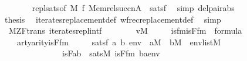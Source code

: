 \begin{isabellebody}
\ \ \ \ \ \ \isamarkupfalse%
\ repl{\isacharunderscore}{\kern0pt}sats{\isacharbrackleft}{\kern0pt}of\ M\ {\isacharquery}{\kern0pt}f\ {\isachardoublequoteopen}{\isacharbrackleft}{\kern0pt}Memrel{\isacharparenleft}{\kern0pt}succ{\isacharparenleft}{\kern0pt}n{\isacharparenright}{\kern0pt}{\isacharparenright}{\kern0pt}{\isacharcomma}{\kern0pt}A{\isacharcomma}{\kern0pt}{}{\isacharbrackright}{\kern0pt}{\isachardoublequoteclose}{\isacharbrackright}{\kern0pt}\ \ satsf\ \isamarkupfalse%
\ {\isacharparenleft}{\kern0pt}simp\ del{\isacharcolon}{\kern0pt}pair{\isacharunderscore}{\kern0pt}abs{\isacharparenright}{\kern0pt}\isanewline
\ \ \isacommand{{\isacharbraceright}{\kern0pt}}\isamarkupfalse%
\isanewline
\ \ \isamarkupfalse%
\isanewline
\ \ \isamarkupfalse%
\ {\isacharquery}{\kern0pt}thesis\ \isamarkupfalse%
\ iterates{\isacharunderscore}{\kern0pt}replacement{\isacharunderscore}{\kern0pt}def\ wfrec{\isacharunderscore}{\kern0pt}replacement{\isacharunderscore}{\kern0pt}def\ \isamarkupfalse%
\ simp\isanewline
{}\isamarkupfalse%
%
\endisatagproof
{\isafoldproof}%
%
\isadelimproof
\isanewline
%
\endisadelimproof
\isanewline
\isanewline
\isanewline
\isanewline
{}\isamarkupfalse%
\ {\isacharparenleft}{\kern0pt}\ M{\isacharunderscore}{\kern0pt}ZF{\isacharunderscore}{\kern0pt}trans{\isacharparenright}{\kern0pt}\ iterates{\isacharunderscore}{\kern0pt}repl{\isacharunderscore}{\kern0pt}intf\ {\isacharcolon}{\kern0pt}\isanewline
\ \ \isanewline
\ \ \ \ {\isachardoublequoteopen}v{\isasymin}M{\isachardoublequoteclose}\ \isanewline
\ \ \ \ isfm{\isacharcolon}{\kern0pt}{\isachardoublequoteopen}is{\isacharunderscore}{\kern0pt}F{\isacharunderscore}{\kern0pt}fm\ {\isasymin}\ formula{\isachardoublequoteclose}\ \isanewline
\ \ \ \ arty{\isacharcolon}{\kern0pt}{\isachardoublequoteopen}arity{\isacharparenleft}{\kern0pt}is{\isacharunderscore}{\kern0pt}F{\isacharunderscore}{\kern0pt}fm{\isacharparenright}{\kern0pt}{\isacharequal}{\kern0pt}{}{\isachardoublequoteclose}\ \isanewline
\ \ \ \ satsf{\isacharcolon}{\kern0pt}\ {\isachardoublequoteopen}{\isasymAnd}a\ b\ env{\isacharprime}{\kern0pt}{\isachardot}{\kern0pt}\ {\isasymlbrakk}\ a{\isasymin}M\ {\isacharsemicolon}{\kern0pt}\ b{\isasymin}M\ {\isacharsemicolon}{\kern0pt}\ env{\isacharprime}{\kern0pt}{\isasymin}list{\isacharparenleft}{\kern0pt}M{\isacharparenright}{\kern0pt}\ {\isasymrbrakk}\isanewline
\ \ \ \ \ \ \ \ \ \ \ \ \ \ {\isasymLongrightarrow}\ is{\isacharunderscore}{\kern0pt}F{\isacharparenleft}{\kern0pt}a{\isacharcomma}{\kern0pt}b{\isacharparenright}{\kern0pt}\ {\isasymlongleftrightarrow}\ sats{\isacharparenleft}{\kern0pt}M{\isacharcomma}{\kern0pt}\ is{\isacharunderscore}{\kern0pt}F{\isacharunderscore}{\kern0pt}fm{\isacharcomma}{\kern0pt}\ {\isacharbrackleft}{\kern0pt}b{\isacharcomma}{\kern0pt}a{\isacharbrackright}{\kern0pt}{\isacharat}{\kern0pt}env{\isacharprime}{\kern0pt}{\isacharparenright}{\kern0pt}{\isachardoublequoteclose}\isanewline

\end{isabellebody}
